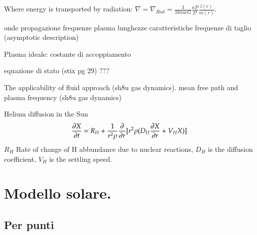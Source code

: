 \documentclass[oneside,12pt,fleqn]{memoir}
\begin{document}
\begin{itemize*}
\item Where energy is transported by radiation: $\nabla=\nabla_{Rad}=\frac{3}{16\pi acG}\frac{\kappa P}{T^4}\frac{l(r)}{m(r)}$.
\item onde propagazione frequenze plasma lunghezze caratteristiche frequenze di taglio (asymptotic description)
\item Plasma ideale: costante di accoppiamento
\item equazione di stato (stix pg 29) ???
\item The applicability of fluid approach (sh8u gas dynamics). mean free path and plasma frequency (sh8u gas dynamics)
\item Helium diffusion in the Sun
\begin{equation*}
    \PDy{t}{X}=R_H+\frac{1}{r^2\rho}\PDof{r}[r^2\rho(D_H\PDy{r}{X}+V_HX)]
\end{equation*}
$R_H$ Rate of change of H abbundance due to nuclear reactions, $D_H$ is the diffusion coefficient, $V_H$ is the settling speed.

\end{itemize*}





\section{Modello solare.}

\subsection{Per punti}
\end{document}
